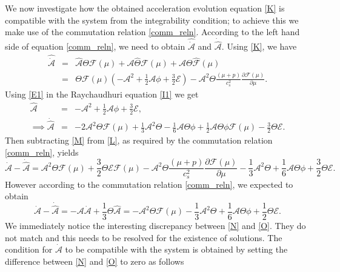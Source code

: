 \documentclass[abstract=on,notitlepage,superscriptaddress,nofootinbib,aps,preprint,prd]{revtex4}
\newcommand{\0}{^{(0)}}
\newcommand{\1}{^{(1)}}
\newcommand{\2}{^{(2)}}
\newcommand{\3}{{}^{(3)}}
\begin{document}
We now investigate how the obtained acceleration evolution equation \eqref{K} is compatible with the system from the integrability condition; to achieve this we make use of the commutation relation \eqref{comm_reln}. According to the left hand side of equation \eqref{comm_reln}, we need to obtain $\hat{\dot{\mathcal{A}}}$ and $\dot{\hat{\mathcal{A}}}$. Using \eqref{K}, we have
\begin{eqnarray}
	 \hat{\dot{\mathcal{A}}} &=&\hat{\mathcal{A}}\Theta\mathcal{F}(\mu)+\mathcal{A}\hat{\Theta}\mathcal{F}(\mu)+\mathcal{A}\Theta\hat{\mathcal{F}}(\mu)\nonumber \\
	&=&\Theta\mathcal{F}(\mu)\left(-\mathcal{A}^2+\frac{1}{2}\mathcal{A}\phi+\frac{3}{2}\mathcal{E}\right)-\mathcal{A}^2\Theta\frac{(\mu+p)}{c_s^2}\frac{\partial \mathcal{F}(\mu)}{\partial \mu}. \label{L}
\end{eqnarray}
Using \eqref{E1} in the Raychaudhuri equation \eqref{I1} we get
\begin{eqnarray}
	\hat{\mathcal{A}}&=&-\mathcal{A}^2+\frac{1}{2}\mathcal{A}\phi+\frac{3}{2}\mathcal{E}, \nonumber \\
	\implies \dot{\hat{\mathcal{A}}} &=& -2\mathcal{A}^2\Theta\mathcal{F}(\mu)+\frac{1}{3}\mathcal{A}^2\Theta-\frac{1}{6}\mathcal{A}\Theta\phi +\frac{1}{2}\mathcal{A}\Theta\phi\mathcal{F}(\mu)-\frac{3}{2}\Theta\mathcal{E}. \label{M} 
\end{eqnarray}
Then subtracting \eqref{M} from \eqref{L}, as required by the commutation relation \eqref{comm_reln}, yields
\begin{equation}
	\hat{\dot{\mathcal{A}}}-\dot{\hat{\mathcal{A}}}=  \mathcal{A}^2\Theta\mathcal{F}(\mu)+\frac{3}{2}\Theta\mathcal{E}\mathcal{F}(\mu)-\mathcal{A}^2\Theta
	\frac{(\mu+p)}{c_s^2}\frac{\partial \mathcal{F}(\mu)}{\partial \mu}-\frac{1}{3}\mathcal{A}^2\Theta+\frac{1}{6}\mathcal{A}\Theta\phi+\frac{3}{2}\Theta\mathcal{E}.\label{N}
\end{equation}
However according to the commutation relation \eqref{comm_reln}, we expected to obtain
\begin{equation}
	\hat{\dot{\mathcal{A}}}-\dot{\hat{\mathcal{A}}}= -\mathcal{A}\dot{\mathcal{A}}+\frac{1}{3}\Theta\hat{\mathcal{A}} =-\mathcal{A}^2\Theta\mathcal{F}(\mu)-\frac{1}{3}\mathcal{A}^2\Theta+\frac{1}{6}\mathcal{A}\Theta\phi+\frac{1}{2}\Theta\mathcal{E}.\label{O}
\end{equation}
We immediately notice the interesting discrepancy between \eqref{N} and \eqref{O}. They do not match and this needs to be resolved for the existence of solutions. The condition for $\dot{\mathcal{A}}$ to be compatible with the system is obtained by setting the difference between \eqref{N} and \eqref{O} to zero as follows
\end{document}
